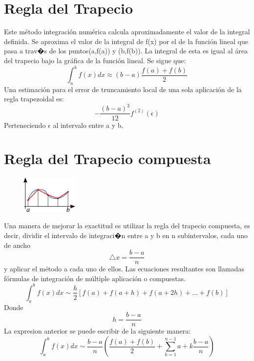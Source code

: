 


\section{Regla del Trapecio}
\label{2:sec:1}
\parindent=0.5cm
\raggedright
Este método integración numérica calcula aproximadamente el valor de la integral definida. 
Se aproxima el valor de la integral de f(x) por el de la función lineal que pasa 
a trav�s de los puntos(a,f(a)) y (b,f(b)). La integral de esta es igual al área del 
trapecio bajo la gráfica de la función lineal. Se sigue que: 
\[
\int_{a}^{b} f(x)dx \approx\left(b-a\right)\frac{f(a)+f(b)}{2} 
\]
Una estimación para el error de truncamiento local de una sola aplicación de la regla trapezoidal es:
\[
-\frac{\left(b-a\right)^3}{12}  \displaystyle f^{(2)}(\epsilon)
\]
Perteneciendo $\epsilon$ al intervalo entre a y b.

\section{Regla del Trapecio compuesta}
\label{2:sec:2}
\begin{figure}[!th]
\begin{center}
\includegraphics[width=0.25\textwidth]{images/Regla-Trap-compuesta}
\end{center}
\end{figure}
\parindent=0.5cm
\raggedright
Una manera de mejorar la exactitud es utilizar la regla del trapecio compuesta, es decir, dividir
el intervalo de integraci�n entre a y b en n subintervalos, cada uno de ancho
\[
\bigtriangleup{x}=\frac{b-a}{n}
\]
y aplicar el método a cada uno de ellos. Las ecuaciones resultantes son llamadas fórmulas
de integración de múltiple aplicación o compuestas.
\[
\int_{a}^{b} f(x)dx \sim\frac{h}{2}\left[f(a) + f(a+h) + f(a+2h) + ... + f(b)\right]
\]
Donde 
\[
h=\frac{b-a}{n} 
\]
La expresion anterior se puede escribir de la siguiente manera:
\[
\int_{a}^{b} f(x)dx \sim\frac{b-a}{n}\left(\frac{f(a)+f(b)}{2} + \sum_{k=1}^{n-1} a+k\frac{b-a}{n} \right)
\]


